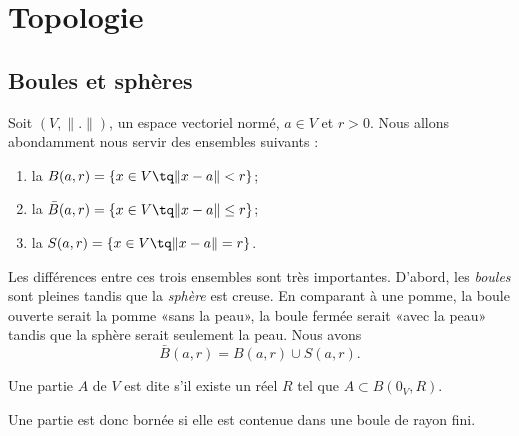 \section{Topologie}

\subsection{Boules et sphères}

\begin{definition}
	Soit $(V,\| . \|)$, un espace vectoriel normé, $a\in V$ et $r>0$. Nous allons abondamment nous servir des ensembles suivants :
	\begin{enumerate}

		\item
			la  $B(a,r)=\{ x\in V\tq \| x-a \|<r \}$;
		\item
			la  $\bar B(a,r)=\{ x\in V\tq \| x-a \|\leq r \}$;
		\item
			la  $S(a,r)=\{ x\in V\tq \| x-a \|=r \}$.

	\end{enumerate}
\end{definition}
Les différences entre ces trois ensembles sont très importantes. D'abord, les \emph{boules} sont pleines tandis que la \emph{sphère} est creuse. En comparant à une pomme, la boule ouverte serait la pomme «sans la peau», la boule fermée serait «avec la peau» tandis que la sphère serait seulement la peau. Nous avons
\begin{equation}
	\bar B(a,r)=B(a,r)\cup S(a,r).
\end{equation}

\begin{definition}
	Une partie $A$ de $V$ est dite  s'il existe un réel $R$ tel que $A\subset B(0_V,R)$.
\end{definition}
Une partie est donc bornée si elle est contenue dans une boule de rayon fini.

